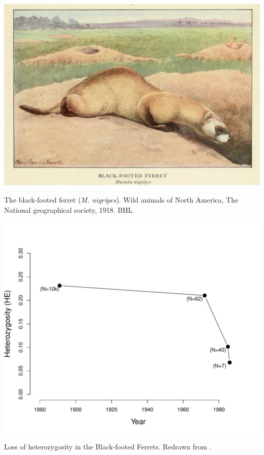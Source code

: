 \begin{marginfigure}
\begin{center}
\includegraphics[width=\textwidth]{illustration_images/Genetic_drift/Black_footed_ferrets/Black_footed_ferret.pdf}
\end{center}
\caption{The black-footed ferret ({\it M. nigripes}). Wild animals of North America, The National geographical
  society, 1918. BHL} \label{fig:black_footed_ferret}  
\end{marginfigure} 

\begin{marginfigure}
\begin{center}
\includegraphics[width= \textwidth]{Journal_figs/genetic_drift/black_footed_ferrets/black_footed_ferrets_He.pdf}
\end{center}
\caption{Loss of heterozygosity in the Black-footed Ferrets. Redrawn
  from \citeauthor{Wisely:02}.} \label{fig:LossHet_ferrets}  
\end{marginfigure} 

